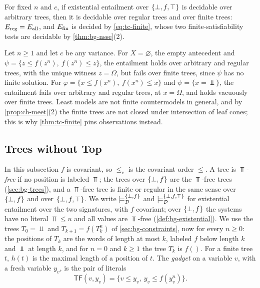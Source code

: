 \begin{corollary}\label{cor:tc-decidable}
For fixed $n$ and $c$, if existential entailment over $\{\bot,f,\top\}$ is decidable over
arbitrary trees, then it is decidable over regular trees and over finite
trees: $E_{\mathrm{reg}}=E_{\mathrm{all}}$, and $E_{\mathrm{fin}}$ is decided by \cref{eq:tc-finite}, whose
two finite-satisfiability tests are decidable by \cref{thm:bg-nsse}(2).
\end{corollary}

\begin{remark}\label{rem:tc-examples}
Let $n\ge1$ and let $c$ be any variance. For $X=\varnothing$, the empty
antecedent and $\psi=\{z\le f(z^n),\ f(z^n)\le z\}$, the entailment holds over
arbitrary and regular trees, with the unique witness $z=\Omega$, but fails
over finite trees, since $\psi$ has no finite solution. For
$\varphi=\{x\le f(x^n),\ f(x^n)\le x\}$ and $\psi=\{x=\Bot\}$, the entailment
fails over arbitrary and regular trees, at $x=\Omega$, and holds vacuously
over finite trees. Least models are not finite countermodels in general, and
by \cref{prop:ch-meet}(2) the finite trees are not closed under intersection
of leaf cones; this is why \cref{thm:tc-finite} pins observations instead.
\end{remark}

\subsection{Trees without Top}\label{sec:tc-gadget}

In this subsection $f$ is covariant, so $\le_c$ is the covariant order $\le$.
A tree is \emph{$\Top$-free} if no position is labeled $\Top$; the trees over
$\{\bot,f\}$ are the $\Top$-free trees (\cref{sec:bg-trees}), and a $\Top$-free tree
is finite or regular in the same sense over $\{\bot,f\}$ and over $\{\bot,f,\top\}$. We write
$\models^{\{\bot,f\}}_{\mathcal D}$ and $\models^{\{\bot,f,\top\}}_{\mathcal D}$ for existential
entailment over the two signatures, with $f$ covariant; over $\{\bot,f\}$ the systems
have no literal $\Top\le u$ and all values are $\Top$-free
(\cref{def:bg-existential}). We use the trees $T_0=\Bot$ and
$T_{k+1}=f(T_k^n)$ of \cref{sec:bg-constraints}, now for every $n\ge0$: the
positions of $T_k$ are the words of length at most $k$, labeled $f$ below
length $k$ and $\Bot$ at length $k$, and for $n=0$ and $k\ge1$ the tree $T_k$
is $f()$. For a finite tree $t$, $h(t)$ is the maximal length of a position of
$t$. The \emph{gadget} on a variable $v$, with a fresh
variable $y_v$, is the pair of literals
\[
 \mathsf{TF}(v,y_v)=\{v\le y_v,\ y_v\le f(y_v^n)\}.
\]

